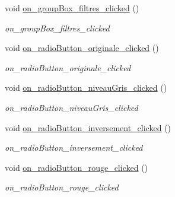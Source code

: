 \begin{DoxyCompactItemize}
\mbox{\label{classMainWindow_a5358808e6910fab1d30a8a5215e29ae7}} 
void \hyperlink{classMainWindow_a5358808e6910fab1d30a8a5215e29ae7}{on\+\_\+group\+Box\+\_\+filtres\+\_\+clicked} ()
\begin{DoxyCompactList}\small\item\em on\+\_\+group\+Box\+\_\+filtres\+\_\+clicked \end{DoxyCompactList}\item 
\mbox{\label{classMainWindow_ad8f6a3b5cb5accbb03bf20a0aa7c8e49}} 
void \hyperlink{classMainWindow_ad8f6a3b5cb5accbb03bf20a0aa7c8e49}{on\+\_\+radio\+Button\+\_\+originale\+\_\+clicked} ()
\begin{DoxyCompactList}\small\item\em on\+\_\+radio\+Button\+\_\+originale\+\_\+clicked \end{DoxyCompactList}\item 
\mbox{\label{classMainWindow_a9eb58116f007312b8b77c997308a2290}} 
void \hyperlink{classMainWindow_a9eb58116f007312b8b77c997308a2290}{on\+\_\+radio\+Button\+\_\+niveau\+Gris\+\_\+clicked} ()
\begin{DoxyCompactList}\small\item\em on\+\_\+radio\+Button\+\_\+niveau\+Gris\+\_\+clicked \end{DoxyCompactList}\item 
\mbox{\label{classMainWindow_a8a4f1cd0f33bc30dc04761c2f7267f20}} 
void \hyperlink{classMainWindow_a8a4f1cd0f33bc30dc04761c2f7267f20}{on\+\_\+radio\+Button\+\_\+inversement\+\_\+clicked} ()
\begin{DoxyCompactList}\small\item\em on\+\_\+radio\+Button\+\_\+inversement\+\_\+clicked \end{DoxyCompactList}\item 
\mbox{\label{classMainWindow_a9d571dd0b7fc606e4881e237a720d295}} 
void \hyperlink{classMainWindow_a9d571dd0b7fc606e4881e237a720d295}{on\+\_\+radio\+Button\+\_\+rouge\+\_\+clicked} ()
\begin{DoxyCompactList}\small\item\em on\+\_\+radio\+Button\+\_\+rouge\+\_\+clicked \end{DoxyCompactList}\item 

\end{DoxyCompactItemize}
